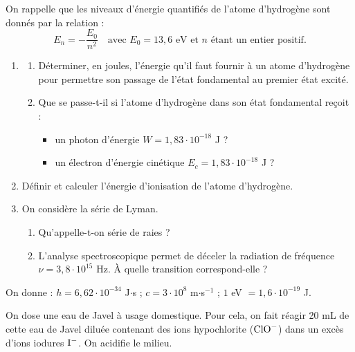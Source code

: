 \documentclass[11pt]{article}
\begin{document}


On rappelle que les niveaux d'énergie quantifiés de l'atome d'hydrogène sont donnés par la relation :
\[ E_n = -\frac{E_0}{n^2} \quad \text{avec } E_0 = 13{,}6 \text{ eV et } n \text{ étant un entier positif.} \]

\begin{enumerate}
  \item \begin{enumerate}[label=\alph*.]
    \item Déterminer, en joules, l'énergie qu'il faut fournir à un atome d'hydrogène pour permettre son passage de l'état fondamental au premier état excité.
    \item Que se passe-t-il si l'atome d'hydrogène dans son état fondamental reçoit :
    \begin{itemize}
      \item un photon d'énergie $W = 1{,}83\cdot10^{-18}$ J ?
      \item un électron d'énergie cinétique $E_c = 1{,}83\cdot10^{-18}$ J ?
    \end{itemize}
  \end{enumerate}
  \item Définir et calculer l'énergie d'ionisation de l'atome d'hydrogène.
  \item On considère la série de Lyman.
  \begin{enumerate}[label=\alph*.]
    \item Qu'appelle-t-on série de raies ?
    \item L'analyse spectroscopique permet de déceler la radiation de fréquence $\nu = 3{,}8\cdot10^{15}$ Hz. À quelle transition correspond-elle ?
  \end{enumerate}
\end{enumerate}
\noindent On donne : $h = 6{,}62\cdot10^{-34}$ J$\cdot$s ; $c = 3\cdot10^8$ m$\cdot$s$^{-1}$ ; $1$ eV $= 1{,}6\cdot10^{-19}$ J.

On dose une eau de Javel à usage domestique. Pour cela, on fait réagir 20 mL de cette eau de Javel diluée contenant des ions hypochlorite ($\mathrm{ClO^-}$) dans un excès d'ions iodures $\mathrm{I^-}$. On acidifie le milieu.
\end{document}
